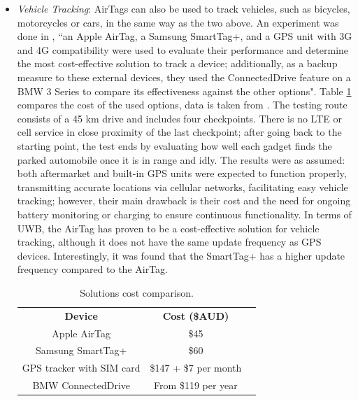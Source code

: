 \documentclass[english]{article}
\begin{document}
\begin{itemize}
  \item \textit{Vehicle Tracking}: AirTags can also be used to track vehicles, such as bicycles, motorcycles or cars, in the same way as the two above. An experiment was done in \cite{Maric2023}, ``an Apple AirTag, a Samsung SmartTag+, and a GPS unit with 3G and 4G compatibility were used to evaluate their performance and determine the most cost-effective solution to track a device; additionally, as a backup measure to these external devices, they used the ConnectedDrive feature on a BMW 3 Series to compare its effectiveness against the other options". Table \ref{vehicles} compares the cost of the used options, data is taken from \cite{Maric2023}. The testing route consists of a 45 km drive and includes four checkpoints. There is no LTE or cell service in close proximity of the last checkpoint; after going back to the starting point, the test ends by evaluating how well each gadget finds the parked automobile once it is in range and idly. The results were as assumed: both aftermarket and built-in GPS units were expected to function properly, transmitting accurate locations via cellular networks, facilitating easy vehicle tracking; however, their main drawback is their cost and the need for ongoing battery monitoring or charging to ensure continuous functionality. In terms of UWB, the AirTag has proven to be a cost-effective solution for vehicle tracking, although it does not have the same update frequency as GPS devices. Interestingly, it was found that the SmartTag+ has a higher update frequency compared to the AirTag.
  \begin{table}[h] 
    \caption{Solutions cost comparison.}
      \centering
      \begin{tabular}{|c|c|c}
        \cline{1-2}
        \textbf{Device}           & \textbf{Cost (\$AUD)}  &  \\ \cline{1-2}
        Apple AirTag              & \$45                   &  \\ \cline{1-2}
        Samsung SmartTag+         & \$60                   &  \\ \cline{1-2}
        GPS tracker with SIM card & \$147 + \$7 per month &  \\ \cline{1-2}
        BMW ConnectedDrive        & From \$119 per year    &  \\ \cline{1-2}
        \end{tabular}
        \label{vehicles}
      \end{table}


\end{itemize}
\end{document}
